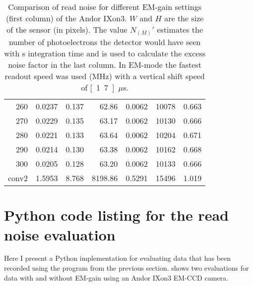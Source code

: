 \begin{table}[!htbp]
\begin{tabular}{r l l r  l r l}
260 & 0.0237 & 0.137 & 62.86 & 0.0062 & 10078 & 0.663 \\
270 & 0.0229 & 0.135 & 63.17 & 0.0062 & 10130 & 0.666 \\
280 & 0.0221 & 0.133 & 63.64 & 0.0062 & 10204 & 0.671 \\
290 & 0.0214 & 0.130 & 63.38 & 0.0062 & 10162 & 0.668 \\
300 & 0.0205 & 0.128 & 63.20 & 0.0062 & 10133 & 0.666 \\
conv2 & 1.5953 & 8.768 & 8198.86 & 0.5291 & 15496 & 1.019 \\
\bottomrule
\end{tabular}
\caption{Comparison of read noise for different EM-gain settings
  (first column) of the Andor IXon3. $W$ and $H$ are the size of the sensor (in pixels). The value $N_{(M)}'$
  estimates the number of photoelectrons the detector would have
  seen with \unit[1]{s} integration time and is used to calculate
  the excess noise factor in the last column. In EM-mode the fastest
  readout speed was used (\unit[10]{MHz}) with a vertical shift speed of
  \unit[1.7]{$\mu$s}.}
  \label{tab:ixon-table}
\end{table}

\newpage

\section{Python code listing for the read noise evaluation}
\label{sec:python-readnoise-eval}
Here I present a Python implementation for evaluating data that has
been recorded using the program from the previous
section.  shows two evaluations for data with and
without EM-gain using an Andor IXon3 EM-CCD camera.

